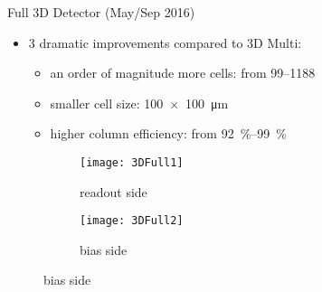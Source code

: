 \begin{frame}{Full 3D Detector (May/Sep 2016)}

	\begin{itemize}
		\itemfill
		\item 3 dramatic improvements compared to 3D Multi:
		\vspace*{3pt}
			\begin{itemize}
				\itemfill
				\item an order of magnitude more cells: from \SIrange{99}{1188}{}
				\item smaller cell size: \SI{100x100}{\micro\meter}
				\item higher column efficiency: from \SIrange{92}{99}{\%}
			\end{itemize}

	\end{itemize}
	
	\begin{figure}
		\centering
		\begin{subfigure}{0.45\textwidth}  
			\centering 
			\texttt{[image: 3DFull1]}
			\caption{readout side}
		\end{subfigure}
		\begin{subfigure}{0.45\textwidth} 
			\centering 
			\texttt{[image: 3DFull2]}
			\caption{bias side}
		\end{subfigure}
	\end{figure}\vspace*{-15pt}

\end{frame}
